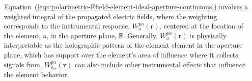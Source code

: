 \documentclass[
  journal=pasa,
  manuscript=article-type,
  year=2020,
  volume=37,
]{cup-journal}
\begin{document}
Equation~(\ref{eqn:polarimetric-Efield-element-ideal-aperture-continuous}) involves a weighted integral of the propagated electric fields, where the weighting corresponds to the instrumental response, $W_{a}^{p\alpha}(\boldsymbol{r})$, centered at the location of the element, $a$, in the aperture plane, $\mathbb{R}$. Generally, $W_{a}^{p\alpha}(\boldsymbol{r})$ is physically interpretable as the holographic pattern of the element element in the aperture plane, which has support over the element's area of influence where it collects signals from. 
$W_{a_m}^{p\alpha}(\boldsymbol{r})$ can also include other instrumental effects that influence the element behavior. 
\end{document}
